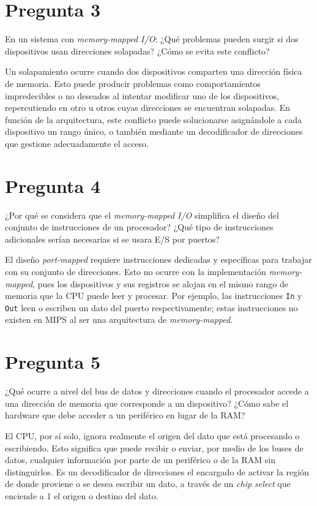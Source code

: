 \documentclass[12pt]{article}
\begin{document}
\section*{Pregunta 3}
En un sistema con \textit{memory-mapped I/O}: ¿Qué problemas pueden surgir si dos dispositivos usan direcciones solapadas? ¿Cómo se evita este conflicto?

Un solapamiento ocurre cuando dos dispositivos comparten una dirección física de memoria. Esto puede producir problemas como comportamientos impredecibles o no deseados al intentar modificar uno de los dispositivos, repercutiendo en otro u otros cuyas direcciones se encuentran solapadas. En función de la arquitectura, este conflicto puede solucionarse asignándole a cada dispositivo un rango único, o también mediante un decodificador de direcciones que gestione adecuadamente el acceso.

\section*{Pregunta 4}
¿Por qué se considera que el \textit{memory-mapped I/O} simplifica el diseño del conjunto de instrucciones de un procesador? ¿Qué tipo de instrucciones adicionales serían necesarias si se usara E/S por puertos?

El diseño \textit{port-mapped} requiere instrucciones dedicadas y específicas para trabajar con su conjunto de direcciones. Esto no ocurre con la implementación \textit{memory-mapped}, pues los dispositivos y sus registros se alojan en el mismo rango de memoria que la CPU puede leer y procesar. Por ejemplo, las instrucciones \texttt{In} y \texttt{Out} leen o escriben un dato del puerto respectivamente; estas instrucciones no existen en MIPS al ser una arquitectura de \textit{memory-mapped}.

\section*{Pregunta 5}
¿Qué ocurre a nivel del bus de datos y direcciones cuando el procesador accede a una dirección de memoria que corresponde a un dispositivo? ¿Cómo sabe el hardware que debe acceder a un periférico en lugar de la RAM?

El CPU, por sí solo, ignora realmente el origen del dato que está procesando o escribiendo. Esto significa que puede recibir o enviar, por medio de los buses de datos, cualquier información por parte de un periférico o de la RAM sin distinguirlos. Es un decodificador de direcciones el encargado de activar la región de donde proviene o se desea escribir un dato, a través de un \textit{chip select} que enciende a 1 el origen o destino del dato.
\end{document}
